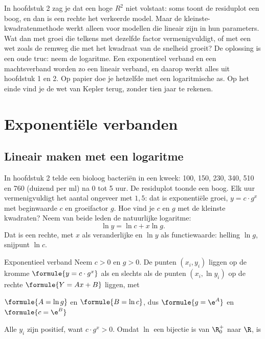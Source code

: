 In hoofdstuk 2 zag je dat een hoge $R^2$ niet volstaat: soms toont de residuplot een boog, en dan is een rechte het verkeerde model. Maar de kleinste-kwadratenmethode werkt alleen voor modellen die lineair zijn in hun parameters. Wat dan met groei die telkens met dezelfde factor vermenigvuldigt, of met een wet zoals de remweg die met het kwadraat van de snelheid groeit? De oplossing is een oude truc: neem de logaritme. Een exponentieel verband en een machtsverband worden zo een lineair verband, en daarop werkt alles uit hoofdstuk 1 en 2. Op papier doe je hetzelfde met een logaritmische as. Op het einde vind je de wet van Kepler terug, zonder tien jaar te rekenen.

\begin{oefeningen}[Start]

\end{oefeningen}

\section{Exponentiële verbanden}

\subsection{Lineair maken met een logaritme}

In hoofdstuk 2 telde een bioloog bacteriën in een kweek: 100, 150, 230, 340, 510 en 760 (duizend per ml) na 0 tot 5 uur. De residuplot toonde een boog. Elk uur vermenigvuldigt het aantal ongeveer met $1{,}5$: dat is exponentiële groei, $y = c \cdot g^x$ met beginwaarde $c$ en groeifactor $g$. Hoe vind je $c$ en $g$ met de kleinste kwadraten? Neem van beide leden de natuurlijke logaritme:
\[ \ln y = \ln c + x \ln g . \]
Dat is een rechte, met $x$ als veranderlijke en $\ln y$ als functiewaarde: helling $\ln g$, snijpunt $\ln c$.

\begin{theorie}
\begin{stelling}{Exponentieel verband}
Neem $c > 0$ en $g > 0$. De punten $(x_i, y_i)$ liggen op de kromme $\formule{y = c \cdot g^x}$ als en slechts als de punten $(x_i, \ln y_i)$ op de rechte $\formule{Y = Ax + B}$ liggen, met

\vspace{1mm}
\qquad $\formule{A = \ln g}$ \quad en \quad $\formule{B = \ln c}$, \quad dus \quad $\formule{g = \e^A}$ \quad en \quad $\formule{c = \e^B}$
\end{stelling}

\begin{bewijs}
Alle $y_i$ zijn positief, want $c \cdot g^x > 0$. Omdat $\ln$ een bijectie is van $\R^+_0$ naar $\R$, is
\end{bewijs}
\end{theorie}

